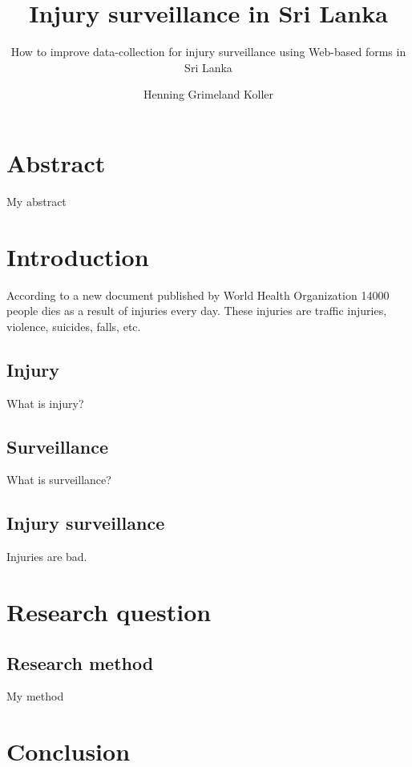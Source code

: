 \documentclass[UKenglish]{ifimaster}
\title{Injury surveillance in Sri Lanka}
\subtitle{How to improve data-collection for injury surveillance
using Web-based forms in Sri Lanka}
\author{Henning Grimeland Koller}
\newcommand{\WHO}{World Health Organization}
\begin{document}
\ififorside{}
\frontmatter{}
\maketitle{}

\chapter*{Abstract}
My abstract
\tableofcontents{}
\listoffigures{}
\listoftables{}
\mainmatter{}

\chapter*{Introduction}
According to a new document published by \WHO\cite{who-article} 14000 people dies as a result of injuries every day.
These injuries are traffic injuries, violence, suicides, falls, etc.
\section{Injury}
What is injury?
\section{Surveillance}
What is surveillance?
\section{Injury surveillance}
Injuries are bad. 

\chapter*{Research question}
\section{Research method}
My method

\chapter{Conclusion}

\backmatter{}
\printbibliography
\end{document}
